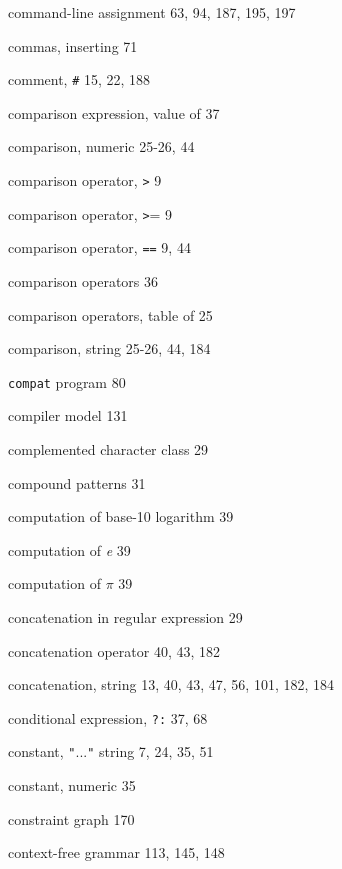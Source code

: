 \begin{multicols}{3}
\hangindent=4pc  command-line assignment 63, 94, 187, 195, 197

\hangindent=4pc  commas, inserting 71

\hangindent=4pc  comment, \verb'#' 15, 22, 188

\hangindent=4pc  comparison expression, value of 37

\hangindent=4pc  comparison, numeric 25-26, 44

\hangindent=4pc  comparison operator, \verb'>' 9

\hangindent=4pc  comparison operator, \verb'>'= 9

\hangindent=4pc  comparison operator, \verb'==' 9, 44

\hangindent=4pc  comparison operators 36

\hangindent=4pc  comparison operators, table of 25

\hangindent=4pc  comparison, string 25-26, 44, 184

\hangindent=4pc  \verb'compat' program 80

\hangindent=4pc  compiler model 131

\hangindent=4pc  complemented character class 29

\hangindent=4pc  compound patterns 31

\hangindent=4pc  computation of base-10 logarithm 39

\hangindent=4pc  computation of \textit{e} 39

\hangindent=4pc  computation of $\pi$ 39

\hangindent=4pc  concatenation in regular expression 29

\hangindent=4pc  concatenation operator 40, 43, 182

\hangindent=4pc  concatenation, string 13, 40, 43, 47, 56, 101, 182, 184

\hangindent=4pc  conditional expression, \verb'?:' 37, 68

\hangindent=4pc  constant, \verb'"'...\verb'"' string 7, 24, 35, 51

\hangindent=4pc  constant, numeric 35

\hangindent=4pc  constraint graph 170

\hangindent=4pc  context-free grammar 113, 145, 148


\end{multicols}
